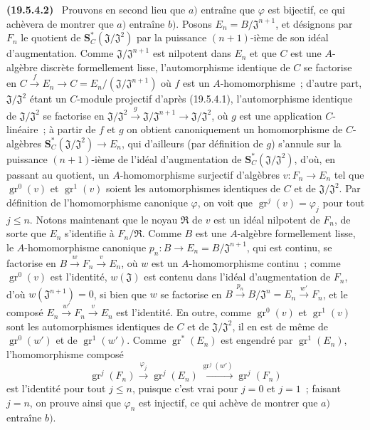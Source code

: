 \documentclass[10pt,oneside]{book}
\makeatletter
\newcommand{\gr}{\operatorname{gr}}
\newcommand{\setmanualcurrentlabel}[1]{\def\@currentlabel{#1}}
\newenvironment{env}[1][]{\setmanualcurrentlabel{#1}\par\medskip\noindent\textbf{(#1)}\ }{\par}
\makeatother
\begin{document}
\begin{env}[19.5.4.2]
\label{0.19.5.4.2-fr}
Prouvons en second lieu que $a)$ entraîne que $\varphi$ est bijectif, ce qui
achèvera de montrer que $a)$ entraîne $b)$. Posons
$E_n=B/\mathfrak J^{n+1}$, et désignons par $F_n$ le quotient de
$\mathbf S_C^*(\mathfrak J/\mathfrak J^2)$ par la puissance $(n+1)$-ième de
son idéal d'augmentation. Comme $\mathfrak J/\mathfrak J^{n+1}$ est nilpotent
dans $E_n$ et que $C$ est une $A$-algèbre discrète formellement lisse,
l'automorphisme identique de $C$ se factorise en
$C\xrightarrow{f}E_n\to C=E_n/(\mathfrak J/\mathfrak J^{n+1})$ où $f$ est un
$A$-homomorphisme~; d'autre part, $\mathfrak J/\mathfrak J^2$ étant un
$C$-module projectif d'après (19.5.4.1), l'automorphisme identique de
$\mathfrak J/\mathfrak J^2$ se factorise en
$\mathfrak J/\mathfrak J^2\xrightarrow{g}\mathfrak J/\mathfrak J^{n+1}
\to\mathfrak J/\mathfrak J^2$, où $g$ est une application $C$-linéaire~; à
partir de $f$ et $g$ on obtient canoniquement un homomorphisme de $C$-algèbres
$\mathbf S_C^*(\mathfrak J/\mathfrak J^2)\to E_n$, qui d'ailleurs (par
définition de $g$) s'annule sur la puissance $(n+1)$-ième de l'idéal
d'augmentation de $\mathbf S_C^*(\mathfrak J/\mathfrak J^2)$, d'où, en
passant au quotient, un $A$-homomorphisme surjectif d'algèbres
$v:F_n\to E_n$ tel que $\gr^0(v)$ et $\gr^1(v)$ soient les automorphismes
identiques de $C$ et de $\mathfrak J/\mathfrak J^2$. Par définition de
l'homomorphisme canonique $\varphi$, on voit que $\gr^j(v)=\varphi_j$ pour tout
$j\leq n$. Notons maintenant que le noyau $\mathfrak R$ de $v$ est un idéal
nilpotent de $F_n$, de sorte que $E_n$ s'identifie à $F_n/\mathfrak R$. Comme
$B$ est une $A$-algèbre formellement lisse, le $A$-homomorphisme canonique
$p_n:B\to E_n=B/\mathfrak J^{n+1}$, qui est continu, se factorise en
$B\xrightarrow{w}F_n\xrightarrow{v}E_n$, où $w$ est un $A$-homomorphisme
continu~; comme $\gr^0(v)$ est l'identité, $w(\mathfrak J)$ est contenu dans
l'idéal d'augmentation de $F_n$, d'où $w(\mathfrak J^{n+1})=0$, si bien que
$w$ se factorise en
$B\xrightarrow{p_n}B/\mathfrak J^n=E_n\xrightarrow{w'}F_n$, et le composé
$E_n\xrightarrow{w'}F_n\xrightarrow{v}E_n$ est l'identité. En outre, comme
$\gr^0(v)$ et $\gr^1(v)$ sont les automorphismes identiques de $C$ et de
$\mathfrak J/\mathfrak J^2$, il en est de même de $\gr^0(w')$ et de
$\gr^1(w')$. Comme $\gr^*(E_n)$ est engendré par $\gr^1(E_n)$,
l'homomorphisme composé
\[
  \gr^j(F_n)\xrightarrow{\varphi_j}\gr^j(E_n)
  \xrightarrow{\gr^j(w')}\gr^j(F_n)
\]
est l'identité pour tout $j\leq n$, puisque c'est vrai pour $j=0$ et $j=1$~;
faisant $j=n$, on prouve ainsi que $\varphi_n$ est injectif, ce qui achève de
montrer que $a)$ entraîne $b)$.
\end{env}
\end{document}
